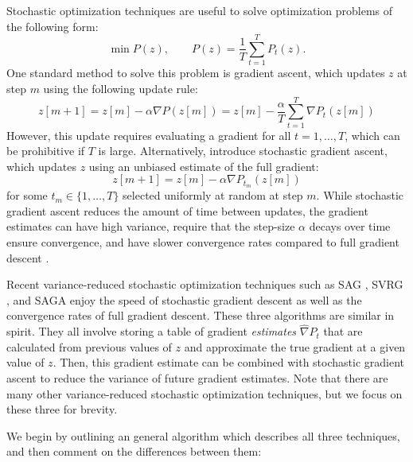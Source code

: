 Stochastic optimization techniques are useful to solve optimization problems of the following form:
%
\begin{equation*}
    \min P(z), \qquad P(z) = \frac{1}{T}\sum_{t = 1}^T P_t(z).
\end{equation*}
%
One standard method to solve this problem is gradient ascent, which updates $z$ at step $m$ using the following update rule:
%
\begin{equation*}
    z[m+1] = z[m] - \alpha \nabla P(z[m]) =  z[m] - \frac{\alpha}{T} \sum_{t=1}^T \nabla P_t(z[m])
\end{equation*}
%
However, this update requires evaluating a gradient for all $t = 1,\ldots,T$, which can be prohibitive if $T$ is large. Alternatively, \citet{Robbins:1951} introduce stochastic gradient ascent, which updates $z$ using an unbiased estimate of the full gradient:
%
\begin{equation*}
    z[m+1] = z[m] - \alpha \nabla P_{t_m}(z[m])
\end{equation*}
%
for some $t_m \in \{1,\ldots,T\}$ selected uniformly at random at step $m$. While stochastic gradient ascent reduces the amount of time between updates, the gradient estimates can have high variance, require that the step-size $\alpha$ decays over time ensure convergence, and have slower convergence rates compared to full gradient descent \citep{Schmidt:2017}.

Recent variance-reduced stochastic optimization techniques such as SAG \citep{Schmidt:2017}, SVRG \citep{Johnson:2013}, and SAGA \citep{Defazio:2014} enjoy the speed of stochastic gradient descent as well as the convergence rates of full gradient descent. These three algorithms are similar in spirit. They all involve storing a table of gradient \textit{estimates} $\widehat \nabla P_t$ that are calculated from previous values of $z$ and approximate the true gradient at a given value of $z$. Then, this gradient estimate can be combined with stochastic gradient ascent to reduce the variance of future gradient estimates. Note that there are many other variance-reduced stochastic optimization techniques, but we focus on these three for brevity. 

We begin by outlining an general algorithm which describes all three techniques, and then comment on the differences between them:

